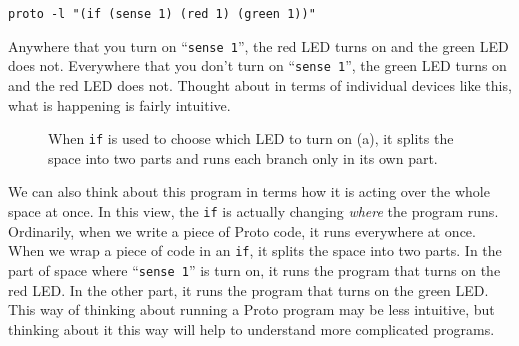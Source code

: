 \documentclass{article}
\newcommand\code[1]{\begin{center}\var{#1}\end{center}}
\newcommand\var[1]{{\tt #1}}
\newcommand\qvar[1]{``{\tt #1}''}
\begin{document}
\code{proto -l "(if (sense 1) (red 1) (green 1))"}

Anywhere that you turn on \qvar{sense 1}, the red LED turns on and the
green LED does not.  Everywhere that you don't turn on \qvar{sense 1},
the green LED turns on and the red LED does not.  Thought about in
terms of individual devices like this, what is happening is fairly
intuitive.

\begin{figure}[ht]
\centering
{}
\caption{When \var{if} is used to choose which LED to turn on (a), it
  splits the space into two parts and runs each branch only in its own
  part.}
\label{f:restriction}
\end{figure}

We can also think about this program in terms how it is acting over
the whole space at once.  In this view, the \var{if} is actually
changing {\em where} the program runs.  Ordinarily, when we write a
piece of Proto code, it runs everywhere at once.  When we wrap a piece
of code in an \var{if}, it splits the space into two parts.  In the
part of space where \qvar{sense 1} is turn on, it runs the program
that turns on the red LED.  In the other part, it runs the program
that turns on the green LED.  This way of thinking about running a
Proto program may be less intuitive, but thinking about it this way
will help to understand more complicated programs.
\end{document}
